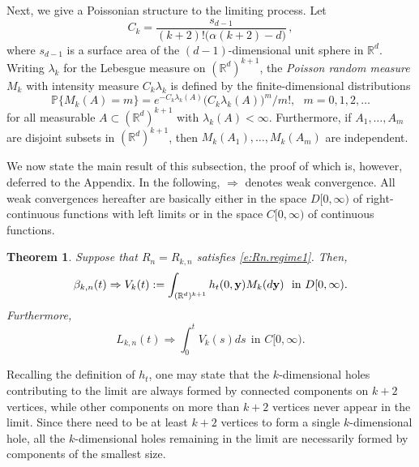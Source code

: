 \documentclass[11pt]{amsart}
\numberwithin{equation}{section}
\theoremstyle{plain}
\newtheorem{theorem}{Theorem}[section]
\theoremstyle{definition}
\begin{document}
Next, we give a Poissonian structure to the limiting process. Let
\begin{equation}  \label{e:def.Ck}
C_k = \frac{s_{d-1}}{(k+2)! \bigl( \alpha (k+2) - d \bigr)}\,,
\end{equation}
where $s_{d-1}$ is a surface area of the $(d-1)$-dimensional unit sphere in ${{\mathbb R}}^d$. Writing $\lambda_k$ for the Lebesgue measure on $({{\mathbb R}}^d)^{k+1}$, the \textit{Poisson random measure}  $M_k$ with intensity measure $C_k \lambda_k$ is defined by the finite-dimensional distributions
$$
{\mathbb{P}} \bigl\{ M_k(A)=m \bigr\} = e^{-C_k\lambda_k(A)} \bigl( C_k\lambda_k(A) \bigr)^m/m!, \ \ \ m=0,1,2,\dots
$$
for all measurable $A \subset ({{\mathbb R}}^d)^{k+1}$ with $\lambda_k(A)<\infty$. Furthermore, if $A_1,\dots,A_m$ are disjoint subsets in $({{\mathbb R}}^d)^{k+1}$, then $M_k(A_1), \dots, M_k(A_m)$ are independent.

We now state the main result of this subsection, the proof of which is, however, deferred to the Appendix. In the following, $\Rightarrow$ denotes weak convergence. All weak convergences hereafter are basically either in the space $D[0,\infty)$ of right-continuous functions with left limits or in the space $C[0,\infty)$ of continuous functions.
\begin{theorem}  \label{t:sparse.poisson}
Suppose that $R_n = R_{k,n}$ satisfies \eqref{e:Rn.regime1}. Then,
\begin{equation}  \label{e:limit.betti.first}
\beta_{k,n}(t) \Rightarrow V_k(t):= \int_{({{\mathbb R}}^d)^{k+1}} h_t(0,{{\bf y}}) M_k(d{{\bf y}}) \ \ \text{in } D[0,\infty).
\end{equation}
Furthermore,
\begin{equation}  \label{e:limit.barcode.first}
L_{k,n}(t) \Rightarrow \int_0^tV_k(s)ds \ \ \text{in } C[0,\infty).
\end{equation}
\end{theorem}

Recalling the definition of $h_t$, one may state that the $k$-dimensional holes contributing to the limit are always formed by connected components on $k+2$ vertices, while other components on more than $k+2$ vertices never appear in the limit. Since there need to be at least $k+2$ vertices to form a single $k$-dimensional hole, all the $k$-dimensional holes  remaining in the limit are necessarily formed by components of the smallest size.
\end{document}
